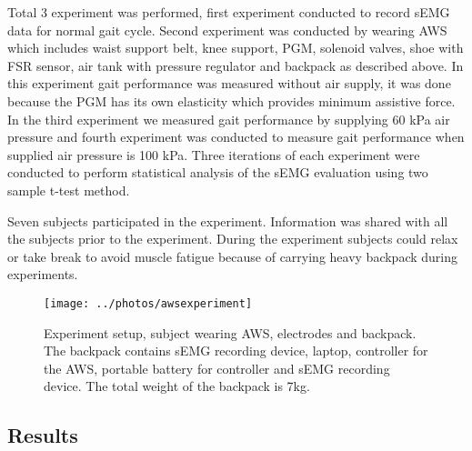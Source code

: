 \documentclass[letterpaper, 10 pt, conference]{ieeeconf}  %
\begin{document}
Total 3 experiment was performed, first experiment conducted to record sEMG data for normal gait cycle. Second experiment was conducted by wearing AWS which includes waist support belt, knee support, PGM, solenoid valves, shoe with FSR sensor, air tank with pressure regulator and backpack as described above. In this experiment gait performance was measured without air supply, it was done because the PGM has its own elasticity which provides minimum assistive force. In the third experiment we measured gait performance by supplying 60 kPa air pressure and fourth experiment was conducted to measure gait performance when supplied air pressure is 100 kPa. Three iterations of each experiment were conducted to perform statistical analysis of the sEMG evaluation using two sample t-test method.  

Seven subjects participated in the experiment. Information was shared with all the subjects prior to the experiment. During the experiment subjects could relax or take break to avoid muscle fatigue because of carrying heavy backpack during experiments.


\begin{figure}
	\centering
	\texttt{[image: ../photos/awsexperiment]}
	\caption{Experiment setup, subject wearing AWS, electrodes and backpack. The backpack contains sEMG recording device, laptop, controller for the AWS, portable battery for controller and sEMG recording device. The total weight of the backpack is 7kg.}
	\label{fig:experimentsetup}
\end{figure}

\subsection{Results}
\end{document}
